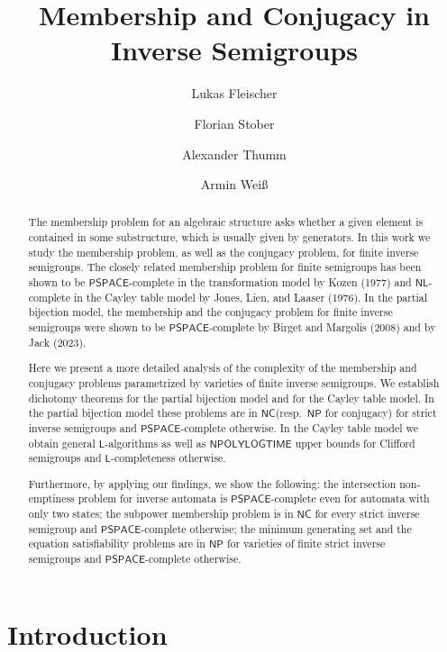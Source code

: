 \documentclass[anonymous,letter,UKenglish,cleveref,autoref,thm-restate]{lipics-v2021}
\title{Membership and Conjugacy in Inverse Semigroups}
\author{Lukas Fleischer}{FMI, University of Stuttgart \\ Universitätsstraße 38, 70569 Stuttgart, Germany}{lfleischer@lfos.de}{https://orcid.org/0000-0001-5234-4348}{}
\author{Florian Stober}{FMI, University of Stuttgart \\ Universitätsstraße 38, 70569 Stuttgart, Germany}{florian.stober@fmi.uni-stuttgart.de}{https://orcid.org/0000-0002-5516-6660}{}
\author{Alexander Thumm}{University of Siegen \\ Hölderlinstraße 3, 57076 Siegen, Germany}{alexander.thumm@uni-siegen.de}{https://orcid.org/0009-0005-4240-2045}{}
\author{Armin Weiß}{FMI, University of Stuttgart \\ Universitätsstraße 38, 70569 Stuttgart, Germany}{armin.weiss@fmi.uni-stuttgart.de}{https://orcid.org/0000-0002-7645-5867}{Supported by the German Research Foundation (DFG) grant WE 6835/1-2.}
\newcommand{\NPOLYLOGTIME}{\ensuremath{\mathsf{NPOLYLOGTIME}}\xspace}
\newcommand{\NC}{\ensuremath{\mathsf{NC}}\xspace}
\newcommand{\LOGSPACE}{\ensuremath{\mathsf{L}}\xspace}
\newcommand{\NL}{\ensuremath{\mathsf{NL}}\xspace}
\newcommand{\NP}{\ensuremath{\mathsf{NP}}\xspace}
\newcommand{\PSPACE}{\ensuremath{\mathsf{PSPACE}}\xspace}
\theoremstyle{plain}
\theoremstyle{plain}
\begin{document}
\maketitle

\begin{abstract}
  The membership problem for an algebraic structure asks whether a given element is contained in some substructure, which is usually given by generators.
  In this work we study the membership problem, as well as the conjugacy problem, for finite inverse semigroups. 
The closely related membership problem for finite semigroups has been shown to be \PSPACE-complete in the transformation model by Kozen (1977) and \NL-complete in the Cayley table model by Jones, Lien, and Laaser (1976). 
In the partial bijection model, the membership and the conjugacy problem for finite inverse semigroups were shown to be \PSPACE-complete by Birget and Margolis (2008) and by Jack (2023).

Here we present a more detailed analysis of the complexity of the membership and conjugacy problems parametrized by varieties of finite inverse semigroups.
We establish dichotomy theorems for the partial bijection model and for the Cayley table model.
In the partial bijection model these problems are in \NC (resp.\ \NP for conjugacy) for strict inverse semigroups and \PSPACE-complete otherwise.
In the Cayley table model we obtain general \LOGSPACE-algorithms as well as \NPOLYLOGTIME upper bounds for Clifford semigroups and \LOGSPACE-completeness otherwise.

Furthermore, by applying our findings, we show the following:
the intersection non-emptiness problem for inverse automata is $\PSPACE$-complete even for automata with only two states;
the subpower membership problem is in \NC for every strict inverse semi\-group and \PSPACE-complete otherwise;
the minimum generating set and the equation satisfiability problems are in \NP for varieties of finite strict inverse semigroups and \PSPACE-complete otherwise.
\end{abstract}


\newpage
\thispagestyle{empty}
\tableofcontents


\newpage
\setcounter{page}{1}
\section{Introduction}
\end{document}

